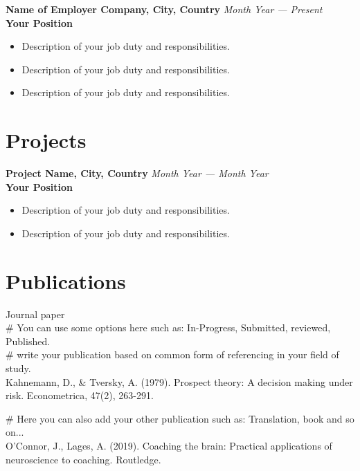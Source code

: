 \documentclass[11pt, a4paper]{article}
\newcommand{\itemheader}[2]{
    \noindent\textbf{#1} \hfill \textit{#2} \\
}
\begin{document}
\vspace{0.3cm}

\itemheader{Name of Employer Company, City, Country}{Month Year — Present}
\textbf{Your Position} \\
\begin{itemize}[left=0pt]
    \item Description of your job duty and responsibilities.
    \item Description of your job duty and responsibilities.
    \item Description of your job duty and responsibilities.
\end{itemize}

\section*{Projects}
\itemheader{Project Name, City, Country}{Month Year — Month Year}
\textbf{Your Position} \\
\begin{itemize}[left=0pt]
    \item Description of your job duty and responsibilities.
    \item Description of your job duty and responsibilities.
\end{itemize}

\section*{Publications}
\noindent
Journal paper \\
\# You can use some options here such as: In-Progress, Submitted, reviewed, Published. \\
\# write your publication based on common form of referencing in your field of study. \\
Kahnemann, D., \& Tversky, A. (1979). Prospect theory: A decision making under risk. Econometrica, 47(2), 263-291. \\
\vspace{0.2cm}

\noindent
\# Here you can also add your other publication such as: Translation, book and so on...\\
O'Connor, J., Lages, A. (2019). Coaching the brain: Practical applications of neuroscience to coaching. Routledge.
\end{document}
